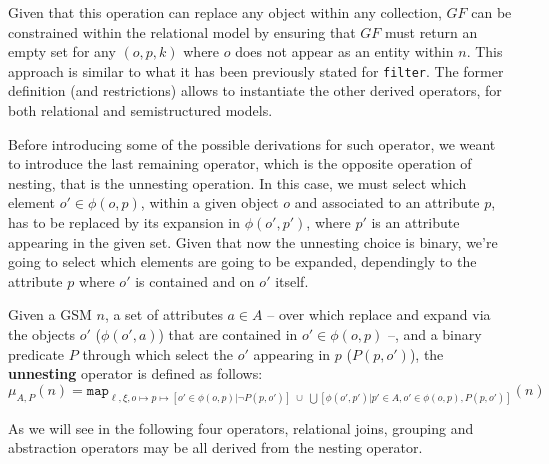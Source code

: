 Given that this operation can replace any object within any collection, $GF$ can be constrained within the relational model by ensuring that $GF$ must return an empty set for any $(o,p,k)$ where $o$ does not appear as an entity within $n$. This approach is similar to what it has been previously stated for \texttt{filter}. The former definition (and restrictions) allows to instantiate the other derived operators, for both relational and semistructured models. 


Before introducing some of the possible derivations for such operator, we weant to introduce the last remaining operator, which is the opposite operation of nesting, that is the unnesting operation. In this case, we must select which element $o'\in\phi(o,p)$, within a given object $o$ and associated to an attribute $p$, has to be replaced by its expansion in $\phi(o',p')$, where $p'$ is an attribute appearing in the given set. Given that now the unnesting choice is binary, we're going to select which elements are going to be expanded, dependingly to the attribute $p$ where $o'$ is contained and on $o'$ itself.

\begin{definition}[Unnesting]
	Given a GSM $n$, a set of attributes $a\in A$ -- over which replace and expand via the objects $o'$ ($\phi(o',a)$) that are contained in $o'\in\phi(o,p)$ --, and a binary predicate $P$ through which select the $o'$ appearing in $p$ ($P(p,o')$), the \textbf{unnesting}  operator is defined as follows:
	\[\mu_{A,P}(n)=\texttt{map}_{\ell,\xi,o\mapsto p\mapsto [o'\in\phi(o,p)|\neg P(p,o')]\;\cup\;\bigcup[\phi(o',p')|p'\in A, o'\in\phi(o,p), P(p,o')]}(n)\]
\end{definition}

As we will see in the following four operators, relational joins, grouping and abstraction operators may be all derived from the nesting operator.

